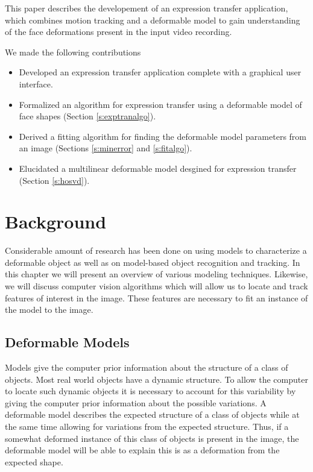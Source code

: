 \documentclass[11pt,a4paper,twoside]{report}
\begin{document}
This paper describes the developement of an expression transfer application, which combines motion tracking and a deformable
model to gain understanding of the face deformations present in the input video
recording. 

We made the following contributions
\begin{itemize}
\item Developed an expression transfer application complete with a graphical
  user interface. 
\item Formalized an algorithm for expression transfer using a deformable model
  of face shapes (Section \ref{s:exptranalgo}).
\item Derived a fitting algorithm for finding the deformable model
  parameters from an image (Sections \ref{s:minerror} and \ref{s:fitalgo}).
\item Elucidated a multilinear deformable model desgined for expression
  transfer (Section \ref{s:hosvd}). 
\end{itemize}

\newpage

\chapter{Background}
Considerable amount of research has been done on using models to characterize a
deformable object as well as on model-based object recognition and
tracking. In this chapter we will present an overview of various modeling techniques. Likewise, we will discuss
computer vision algorithms which will allow us to locate and track features of
interest in the image. These features are necessary to fit an instance
of the model to the image.

\section{Deformable Models}
Models give the computer prior information about the structure of a class of objects. Most
real world objects have a dynamic structure. To allow the computer to locate
such dynamic objects it is necessary to account for this variability by giving the
computer prior information about the possible variations. A deformable model
describes the expected structure of a class of objects while at the same time allowing
for variations from the expected structure. Thus, if a somewhat deformed
instance of this class of objects is present in the image, the deformable model
will be able to explain this is as a deformation from the expected shape.
\end{document}
